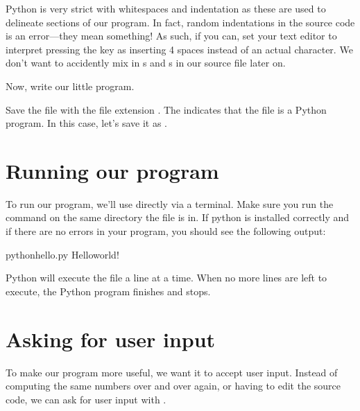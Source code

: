 \documentclass[letterpaper,10pt,english]{jupyterBook}
\begin{document}
\sphinxAtStartPar
Python is very strict with whitespaces and indentation as these are used to delineate sections of our program.
In fact, random indentations in the source code is an error—they mean something!
As such, if you can, set your text editor to interpret pressing the  key as inserting 4 spaces instead of an actual  character.
We don’t want to accidently mix in s and s in our source file later on.

\sphinxAtStartPar
Now, write our little program.

\begin{sphinxVerbatim}[commandchars=\\\{\}]
\end{sphinxVerbatim}

\sphinxAtStartPar
Save the file with the file extension .
The  indicates that the file is a Python program.
In this case, let’s save it as .


\section{Running our program}
\label{\detokenize{first-program:running-our-program}}
\sphinxAtStartPar
To run our program, we’ll use  directly via a terminal. Make sure you run the command on the same directory the file  is in. If python is installed correctly and if there are no errors in your program, you should see the following output:

\begin{sphinxVerbatim}[commandchars=\\\{\}]
\PYGZdl{}pythonhello.py
Helloworld!
\end{sphinxVerbatim}

\sphinxAtStartPar
Python will execute the file a line at a time.
When no more lines are left to execute, the Python program finishes and stops.


\section{Asking for user input}
\label{\detokenize{first-program:asking-for-user-input}}
\sphinxAtStartPar
To make our program more useful, we want it to accept user input.
Instead of computing the same numbers over and over again, or having to edit the source code, we can ask for user input with .
\end{document}
